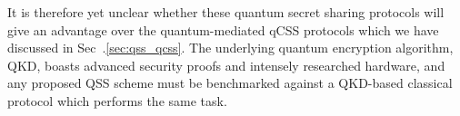 It is therefore yet unclear whether these quantum secret sharing protocols will give an advantage over the quantum-mediated qCSS protocols which we have discussed in Sec~.\ref{sec:qss_qcss}. The underlying quantum encryption algorithm, QKD, boasts advanced security proofs and intensely researched hardware, and any proposed QSS scheme must be benchmarked against a QKD-based classical protocol which performs the same task.